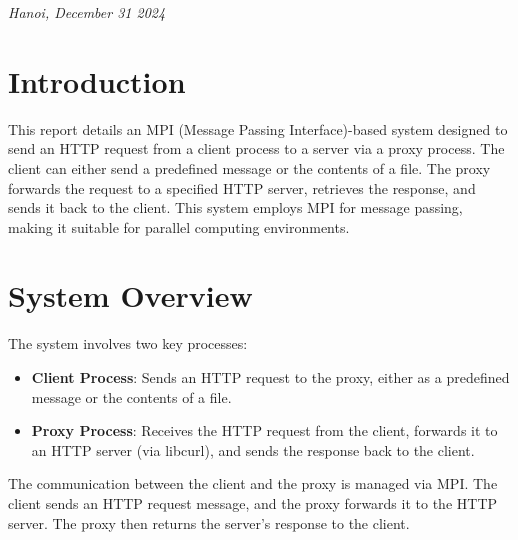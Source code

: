 \documentclass[a4paper,12pt]{article}
\begin{document}
\vfill

\begin{center}
    \textit{Hanoi, December 31 2024}
\end{center}

\tableofcontents

\clearpage
\section{Introduction}
This report details an MPI (Message Passing Interface)-based system designed to send an HTTP request from a client process to a server via a proxy process. The client can either send a predefined message or the contents of a file. The proxy forwards the request to a specified HTTP server, retrieves the response, and sends it back to the client. This system employs MPI for message passing, making it suitable for parallel computing environments.

\section{System Overview}
The system involves two key processes:
\begin{itemize}
    \item \textbf{Client Process}: Sends an HTTP request to the proxy, either as a predefined message or the contents of a file.
    \item \textbf{Proxy Process}: Receives the HTTP request from the client, forwards it to an HTTP server (via libcurl), and sends the response back to the client.
\end{itemize}

The communication between the client and the proxy is managed via MPI. The client sends an HTTP request message, and the proxy forwards it to the HTTP server. The proxy then returns the server's response to the client.
\end{document}
